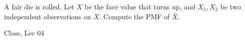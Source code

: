 \begin{samepage}
\begin{ex}
A fair die is rolled. Let $X$ be the face value that turns up, and $X_1, X_2$ be two independent observations on $X$. Compute the PMF of $\bar{X}$.
\end{ex}
\begin{source}
Class, Lec 04
\end{source}
\end{samepage}

